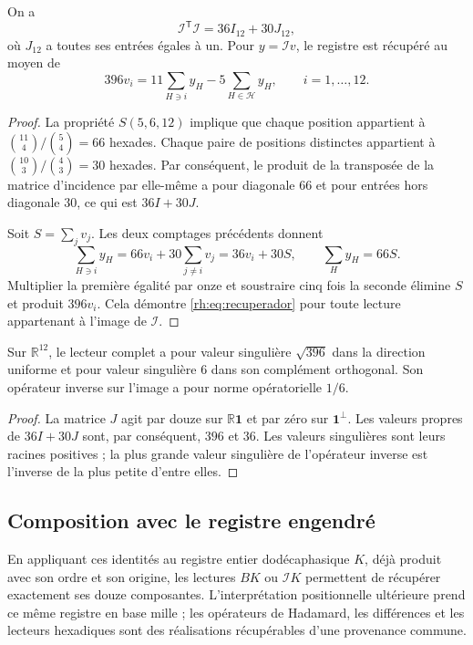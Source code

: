 \begin{theorem}
\label{rh:thm:steiner}
On a
\[
\mathcal I^{\mathsf T}\mathcal I=36I_{12}+30J_{12},
\]
où $J_{12}$ a toutes ses entrées égales à un. Pour
$y=\mathcal I v$, le registre est récupéré au moyen de
\begin{equation}
396v_i=11\sum_{H\ni i}y_H-5\sum_{H\in\mathcal H}y_H,
\qquad i=1,\ldots,12.
\label{rh:eq:recuperador}
\end{equation}
\end{theorem}
\begin{proof}
La propriété $S(5,6,12)$ implique que chaque position appartient à
$\binom{11}{4}/\binom{5}{4}=66$ hexades. Chaque paire de positions
distinctes appartient à $\binom{10}{3}/\binom{4}{3}=30$ hexades.
Par conséquent, le produit de la transposée de la matrice d'incidence par
elle-même a pour diagonale $66$ et pour entrées hors diagonale $30$, ce qui
est $36I+30J$.

Soit $S=\sum_jv_j$. Les deux comptages précédents donnent
\[
\sum_{H\ni i}y_H=66v_i+30\sum_{j\ne i}v_j=36v_i+30S,
\qquad
\sum_Hy_H=66S.
\]
Multiplier la première égalité par onze et soustraire cinq fois la
seconde élimine $S$ et produit $396v_i$. Cela démontre
\eqref{rh:eq:recuperador} pour toute lecture appartenant à
l'image de $\mathcal I$.
\end{proof}

\begin{corollary}
Sur $\mathbb R^{12}$, le lecteur complet a pour valeur singulière
$\sqrt{396}$ dans la direction uniforme et pour valeur singulière $6$ dans son
complément orthogonal. Son opérateur inverse sur l'image a pour norme
opératorielle $1/6$.
\end{corollary}
\begin{proof}
La matrice $J$ agit par douze sur $\mathbb R\mathbf1$ et par zéro
sur $\mathbf1^\perp$. Les valeurs propres de $36I+30J$ sont, par
conséquent, $396$ et $36$. Les valeurs singulières sont leurs racines
positives ; la plus grande valeur singulière de l'opérateur inverse est l'inverse
de la plus petite d'entre elles.
\end{proof}

\subsection{Composition avec le registre engendré}

En appliquant ces identités au registre entier dodécaphasique $K$, déjà
produit avec son ordre et son origine, les lectures $BK$ ou $\mathcal I K$
permettent de récupérer exactement ses douze composantes. L'interprétation
positionnelle ultérieure prend ce même registre en base mille ; les
opérateurs de Hadamard, les différences et les lecteurs hexadiques sont
des réalisations récupérables d'une provenance commune.

